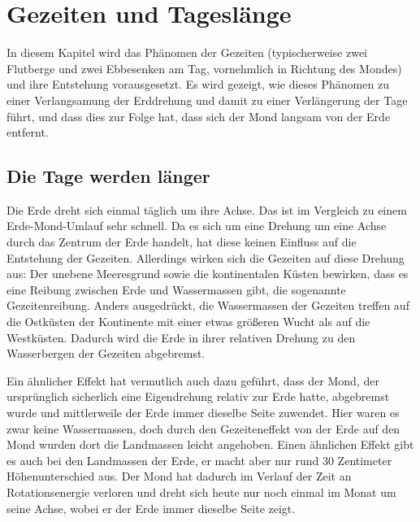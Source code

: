 

\chapter{Gezeiten und Tagesl\"ange}
\label{chap_Gezeiten2}
 
In diesem Kapitel wird das Ph\"anomen der Gezeiten (typischerweise zwei Flutberge
und zwei Ebbesenken am Tag, vornehmlich in Richtung des Mondes) und ihre
Entstehung vorausgesetzt. Es wird gezeigt, wie dieses Ph\"anomen zu einer Verlangsamung
der Erddrehung und damit zu einer Verl\"angerung der Tage f\"uhrt, und dass dies
zur Folge hat, dass sich der Mond langsam von der Erde entfernt. 
 

\section{Die Tage werden l\"anger}
\label{sec_EMWW}

Die Erde dreht sich einmal t\"aglich um ihre Achse. Das ist im Vergleich zu einem
Erde-Mond-Umlauf sehr schnell. Da es sich um eine Drehung um eine Achse durch
das Zentrum der Erde handelt, hat diese keinen Einfluss auf die Entstehung der Gezeiten. 
Allerdings wirken sich die Gezeiten auf diese Drehung aus: Der unebene Meeresgrund
sowie die kontinentalen K\"usten bewirken, dass es eine Reibung zwischen Erde und
Wassermassen gibt, die sogenannte Gezeitenreibung. 
Anders ausgedr\"uckt, die Wassermassen der Gezeiten treffen
auf die Ostk\"usten der Kontinente mit einer etwas gr\"o\ss eren Wucht als auf die
Westk\"usten. Dadurch wird die Erde in ihrer relativen Drehung zu den Wasserbergen
der Gezeiten abgebremst. 

Ein \"ahnlicher Effekt hat vermutlich auch dazu gef\"uhrt, dass der Mond, der urspr\"unglich
sicherlich eine Eigendrehung relativ zur Erde hatte, abgebremst wurde und mittlerweile
der Erde immer dieselbe Seite zuwendet. Hier waren es zwar keine Wassermassen, doch
durch den Gezeiteneffekt von der Erde auf den Mond wurden dort die Landmassen
leicht angehoben. Einen \"ahnlichen Effekt gibt es auch bei den Landmassen der Erde, er
macht aber nur rund 30 Zentimeter H\"ohenunterschied aus. Der Mond hat dadurch im
Verlauf der Zeit an Rotationsenergie verloren und dreht sich heute nur noch einmal im
Monat um seine Achse, wobei er der Erde immer dieselbe Seite zeigt.

